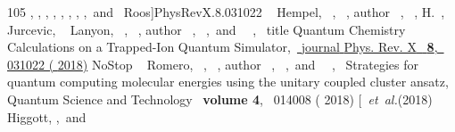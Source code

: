 \documentclass[aps,prx,showpacs,twocolumn,reprint]{revtex4-2}
\begin{document}
{\begin{thebibliography}{105}
{		, , ,
		, , ,
		, ,\ and\ \citenamefont
		{Roos}}]{PhysRevX.8.031022}%
	\BibitemOpen
	 { {~\bibnamefont
			{Hempel}},  {~},
		 {~}, \bibinfo
		{author} {~}, 
		{~},  {\bibfnamefont
			{H.}~},  {~\bibnamefont
			{Jurcevic}},  {\ \bibnamefont
			{Lanyon}},  {~},
		 {~}, \bibinfo
		{author} {~}, 
		{~},\ and\ 
		{\ },\ } {\bibinfo
		{title} {{Quantum Chemistry Calculations on a Trapped-Ion Quantum
				Simulator}},\ }\href {https://doi.org/10.1103/PhysRevX.8.031022} {\bibfield
		{journal} { {Phys. Rev. X}\ }\textbf {
			{8}},\  {031022} ( {2018})}\BibitemShut
	{NoStop}%
	\BibitemOpen
	 { {~\bibnamefont
			{Romero}},  {~},
		 {\ }, \bibinfo
		{author} {~}, 
		{\ },\ and\ 
		{~},\ }
	{ {{Strategies for quantum computing molecular energies using
				the unitary coupled cluster ansatz}},\ }\href@noop {} {
		{ {Quantum Science and Technology}\ }\textbf {\bibinfo
			{volume} {4}},\  {014008} (
		{2018})}%
	\bibitem [{\ \emph {et~al.}(2018)\citenamefont
		{Higgott}, ,\ and\ \citenamefont
}
\end{thebibliography}}
\end{document}
